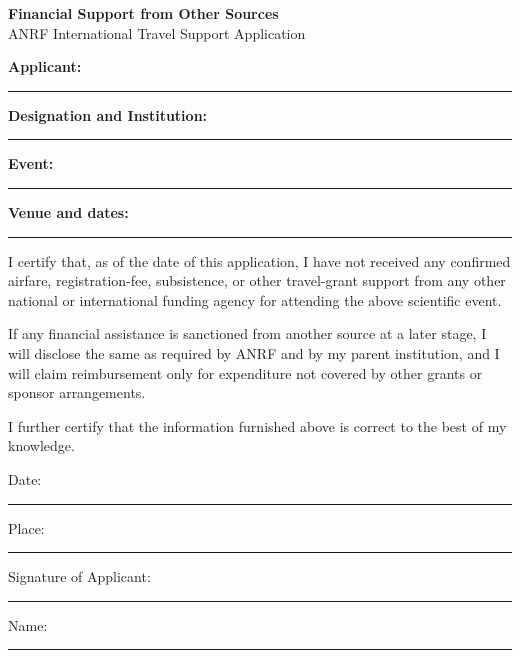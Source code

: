\documentclass[11pt,a4paper]{article}
\newcommand{\blankline}[1]{\rule{#1}{0.4pt}}
\begin{document}
\begin{center}
{\Large \textbf{Financial Support from Other Sources}}\\
{\large ANRF International Travel Support Application}\\[0.5em]
\end{center}

\textbf{Applicant:} \blankline{0.63\textwidth}

\textbf{Designation and Institution:} \blankline{0.50\textwidth}

\textbf{Event:} \blankline{0.70\textwidth}

\textbf{Venue and dates:} \blankline{0.58\textwidth}

\vspace{1.2em}

I certify that, as of the date of this application, I have not received any confirmed airfare, registration-fee, subsistence, or other travel-grant support from any other national or international funding agency for attending the above scientific event.

If any financial assistance is sanctioned from another source at a later stage, I will disclose the same as required by ANRF and by my parent institution, and I will claim reimbursement only for expenditure not covered by other grants or sponsor arrangements.

I further certify that the information furnished above is correct to the best of my knowledge.

\vfill

\noindent Date: \blankline{0.28\textwidth}\hfill Place: \blankline{0.28\textwidth}

\vspace{3em}

\noindent Signature of Applicant: \blankline{0.42\textwidth}

\vspace{1em}

\noindent Name: \blankline{0.46\textwidth}
\end{document}
